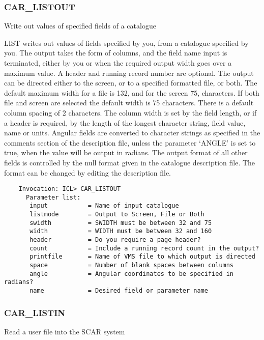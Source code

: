 \subsubsection{CAR\_LISTOUT}

Write out values of specified fields of a catalogue

LIST writes out values of fields specified by you, from a
catalogue specified by you.
The output takes the form of columns, and the field name input is
terminated, either by you or when the required output width goes
over a maximum value.
A header and running record number are optional.
The output can be directed either to the screen, or to a specified
formatted file, or both.
The default maximum width for a file is 132, and for the screen 75,
characters.
If both file and screen are selected the default width is 75 characters.
There is a default column spacing of 2 characters.
The column width is set by the field length, or if a header is required,
by the length of the longest character string, field value, name or units.
Angular fields are converted to character strings as specified in
the comments section of the description file, unless the parameter
`ANGLE' is set to true, when the value will be output in radians.
The output format of all other fields is controlled by the null
format given in the catalogue description file.  The format can be
changed by editing the description file.
\begin{verbatim}
    Invocation: ICL> CAR_LISTOUT
      Parameter list:
       input           = Name of input catalogue
       listmode        = Output to Screen, File or Both
       swidth          = SWIDTH must be between 32 and 75
       width           = WIDTH must be between 32 and 160
       header          = Do you require a page header?
       count           = Include a running record count in the output?
       printfile       = Name of VMS file to which output is directed
       space           = Number of blank spaces between columns
       angle           = Angular coordinates to be specified in radians?
       name            = Desired field or parameter name
\end{verbatim}

\subsubsection{CAR\_LISTIN}

Read a user file into the SCAR system

